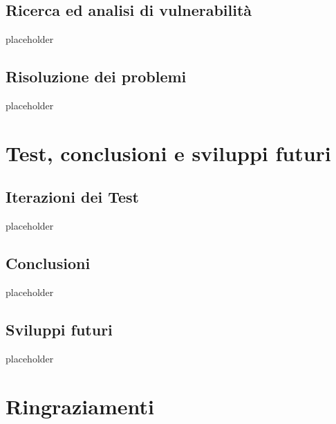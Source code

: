 \documentclass[a4paper,10pt]{memoir}
\begin{document}
\clearpage

\section{Ricerca ed analisi di vulnerabilità}

placeholder

\clearpage

\section{Risoluzione dei problemi}

placeholder

\clearpage


\chapter{Test, conclusioni e sviluppi futuri}

\section{Iterazioni dei Test}

placeholder

\clearpage

\section{Conclusioni}

placeholder

\clearpage

\section{Sviluppi futuri}

placeholder

\clearpage


\chapter*{Ringraziamenti}

\cleardoublepage

\end{document}
